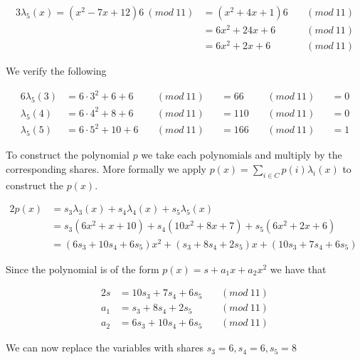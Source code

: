 \noindent
\begin{alignat*}{3}
\lambda_5(x)= (x^2-7x+12)6 \ (mod \ 11) &= (x^2 + 4x+1)6 \ &&(mod \ 11) \\
                                        &= 6x^2 + 24x + 6 \ &&(mod \ 11) \\
                                        &= 6x^2 + 2x + 6 \ &&(mod \ 11)
\end{alignat*}

\noindent
We verify the following

\noindent
\begin{alignat*}{6}
\lambda_5(3) &=  6 \cdot 3^2+6+ 6  \ &&(mod \ 11) &&= 66 \ &&(mod \ 11)  &&= 0 \\
\lambda_5(4) &=  6 \cdot 4^2+8+ 6  \ &&(mod \ 11) &&= 110 \ &&(mod \ 11) &&= 0 \\
\lambda_5(5) &=  6 \cdot 5^2+10+6  \ &&(mod \ 11) &&= 166 \ &&(mod \ 11) &&= 1  
\end{alignat*}




\noindent
To construct the polynomial \begin{math}p\end{math} we take each polynomials and multiply by the corresponding shares. More formally we apply \begin{math}p(x)=\sum\limits_{i \in C} p(i)\lambda_i(x)\end{math} to construct the $p(x)$.



\noindent
 \begin{alignat*}{2}
p(x) &= s_3 \lambda_3 (x) + s_4 \lambda_4 (x) + s_5 \lambda_5 (x) &\\
     &= s_3(6x^2+x+ 10) + s_4(10x^2 + 8x + 7)  + s_5(6x^2 + 2x + 6)&\\
     &= (6s_3+10s_4+6s_5)x^2 + (s_3 + 8s_4 + 2s_5)x  + (10s_3 + 7s_4 + 6s_5)&
\end{alignat*} 
   

\noindent
Since the polynomial is of the form $p(x)=s + a_{1}x+ a_{2}x^2$ we have that

\noindent
\begin{alignat*}{2}
s&  = 10s_3 + 7s_4 + 6s_5 \ &&(mod \ 11)  \\
a_1&= s_3 + 8s_4 + 2s_5\ &&(mod \ 11) \\
a_2&= 6s_3+10s_4+6s_5\ &&(mod \ 11) 
\end{alignat*} 

\noindent
We can now replace the variables with shares $s_3=6, s_4=6, s_5=8$

